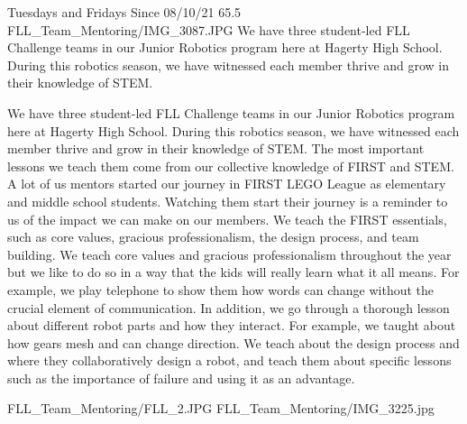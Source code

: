 {Tuesdays and Fridays Since 08/10/21}
{65.5}
{FLL_Team_Mentoring/IMG_3087.JPG}
{We have three student-led FLL Challenge teams in our Junior Robotics program here at Hagerty High School. During this robotics season, we have witnessed each member thrive and grow in their knowledge of STEM.}
{We have three student-led FLL Challenge teams in our Junior Robotics program here at Hagerty High School. During this robotics season, we have witnessed each member thrive and grow in their knowledge of STEM. The most important lessons we teach them come from our collective knowledge of FIRST and STEM. A lot of us mentors started our journey in FIRST LEGO League as elementary and middle school students. Watching them start their journey is a reminder to us of the impact we can make on our members. We teach the FIRST essentials, such as core values, gracious professionalism, the design process, and team building. We teach core values and gracious professionalism throughout the year but we like to do so in a way that the kids will really learn what it all means. For example, we play telephone to show them how words can change without the crucial element of communication. In addition, we go through a thorough lesson about different robot parts and how they interact. For example, we taught about how gears mesh and can change direction. We teach about the design process and where they collaboratively design a robot, and teach them about specific lessons such as the importance of failure and using it as an advantage.  

} 
{FLL_Team_Mentoring/FLL_2.JPG}
{FLL_Team_Mentoring/IMG_3225.jpg}
